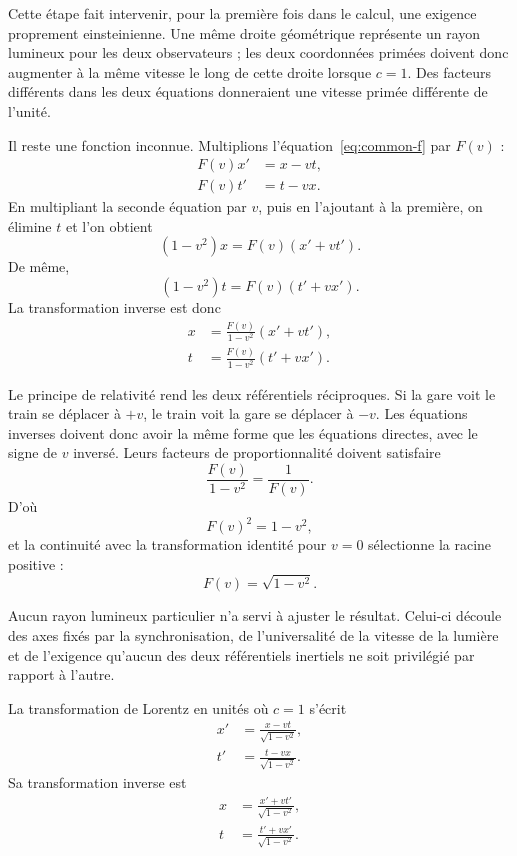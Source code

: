 Cette étape fait intervenir, pour la première fois dans le calcul, une exigence proprement einsteinienne. Une même droite géométrique représente un rayon lumineux pour les deux observateurs ; les deux coordonnées primées doivent donc augmenter à la même vitesse le long de cette droite lorsque \(c=1\). Des facteurs différents dans les deux équations donneraient une vitesse primée différente de l’unité.

Il reste une fonction inconnue. Multiplions l’équation~\eqref{eq:common-f} par \(F(v)\) :
\begin{align}
F(v)x'&=x-vt,\\
F(v)t'&=t-vx.
\end{align}
En multipliant la seconde équation par \(v\), puis en l’ajoutant à la première, on élimine \(t\) et l’on obtient
\begin{equation}
(1-v^2)x=F(v)(x'+vt').
\end{equation}
De même,
\begin{equation}
(1-v^2)t=F(v)(t'+vx').
\end{equation}
La transformation inverse est donc
\begin{align}
x&=\frac{F(v)}{1-v^2}(x'+vt'),\\
t&=\frac{F(v)}{1-v^2}(t'+vx').
\end{align}

Le principe de relativité rend les deux référentiels réciproques. Si la gare voit le train se déplacer à \(+v\), le train voit la gare se déplacer à \(-v\). Les équations inverses doivent donc avoir la même forme que les équations directes, avec le signe de \(v\) inversé. Leurs facteurs de proportionnalité doivent satisfaire
\begin{equation}
\frac{F(v)}{1-v^2}=\frac{1}{F(v)}.
\end{equation}
D’où
\begin{equation}
F(v)^2=1-v^2,
\end{equation}
et la continuité avec la transformation identité pour \(v=0\) sélectionne la racine positive :
\begin{equation}
F(v)=\sqrt{1-v^2}.
\end{equation}

Aucun rayon lumineux particulier n’a servi à ajuster le résultat. Celui-ci découle des axes fixés par la synchronisation, de l’universalité de la vitesse de la lumière et de l’exigence qu’aucun des deux référentiels inertiels ne soit privilégié par rapport à l’autre.

La transformation de Lorentz en unités où \(c=1\) s’écrit
\begin{align}
x'&=\frac{x-vt}{\sqrt{1-v^2}},\\
t'&=\frac{t-vx}{\sqrt{1-v^2}}.
\label{eq:lorentz-c-one}
\end{align}
Sa transformation inverse est
\begin{align}
x&=\frac{x'+vt'}{\sqrt{1-v^2}},\\
t&=\frac{t'+vx'}{\sqrt{1-v^2}}.
\end{align}


